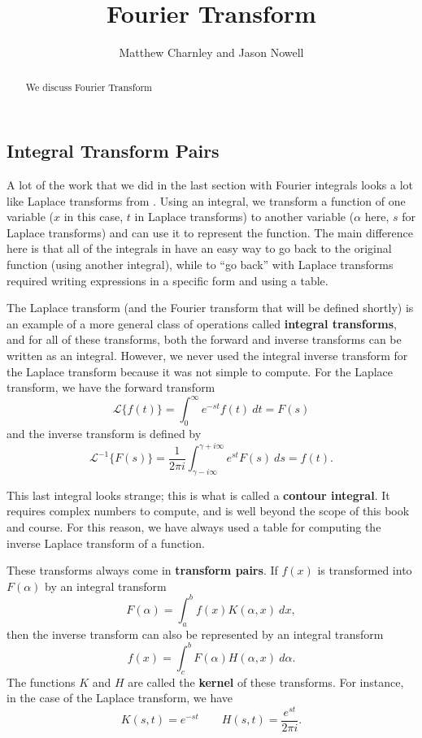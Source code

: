 \documentclass{ximera}
\title{Fourier Transform}
\author{Matthew Charnley and Jason Nowell}
\begin{document}
\begin{abstract}
    We discuss Fourier Transform
\end{abstract}
\maketitle


\label{fourierTransform:section}


\subsection{Integral Transform Pairs}

A lot of the work that we did in the last section with Fourier integrals looks a lot like Laplace transforms from . Using an integral, we transform a function of one variable ($x$ in this case, $t$ in Laplace transforms) to another variable ($\alpha$ here, $s$ for Laplace transforms) and can use it to represent the function. The main difference here is that all of the integrals in  have an easy way to go back to the original function (using another integral), while to ``go back'' with Laplace transforms required writing expressions in a specific form and using a table.

The Laplace transform (and the Fourier transform that will be defined shortly) is an example of a more general class of operations called \textbf{integral transforms}, and for all of these transforms, both the forward and inverse transforms can be written as an integral. However, we never used the integral inverse transform for the Laplace transform because it was not simple to compute. For the Laplace transform, we have the forward transform
\[ 
    \mathcal{L}\{f(t)\} = \int_0^\infty e^{-st} f(t)\ dt = F(s) 
\] 
and the inverse transform is defined by
\[ 
    \mathcal{L}^{-1}\{F(s)\} = \frac{1}{2\pi i} \int_{\gamma - i\infty}^{\gamma +i\infty} e^{st}F(s)\ ds = f(t). 
\]

This last integral looks strange; this is what is called a \textbf{contour integral}. It requires complex numbers to compute, and is well beyond the scope of this book and course. For this reason, we have always used a table for computing the inverse Laplace transform of a function. 

These transforms always come in \textbf{transform pairs}. If $f(x)$ is transformed into $F(\alpha)$ by an integral transform
\[ 
    F(\alpha) = \int_a^b f(x)K(\alpha, x)\ dx, 
\] 
then the inverse transform can also be represented by an integral transform
\[ 
    f(x) = \int_c^b F(\alpha)H(\alpha, x)\ d\alpha. 
\] 
The functions $K$ and $H$ are called the \textbf{kernel} of these transforms. For instance, in the case of the Laplace transform, we have
\[
    K(s, t) = e^{-st} \qquad H(s,t) = \frac{e^{st}}{2\pi i}. 
\]
\end{document}
